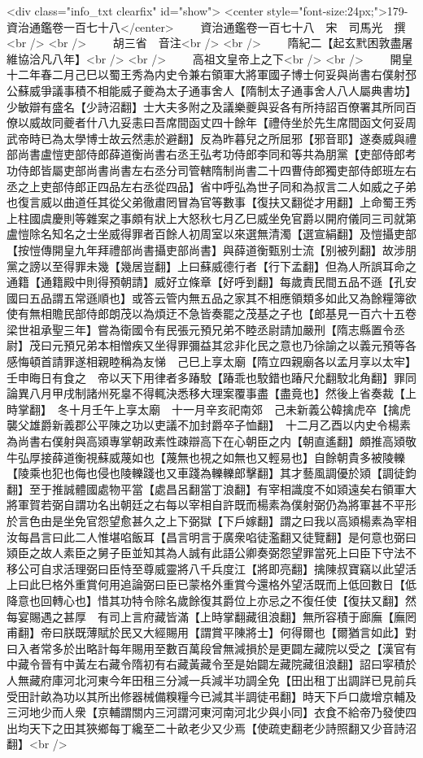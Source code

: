 <div class="info_txt clearfix" id="show">
<center style="font-size:24px;">179-資治通鑑卷一百七十八</center>
  　　資治通鑑卷一百七十八　宋　司馬光　撰<br />
<br />
　　胡三省　音注<br />
<br />
　　隋紀二【起玄黓困敦盡屠維協洽凡八年】<br />
<br />
　　高祖文皇帝上之下<br />
<br />
　　開皇十二年春二月己巳以蜀王秀為内史令兼右領軍大將軍國子博士何妥與尚書右僕射邳公蘇威爭議事積不相能威子夔為太子通事舍人【隋制太子通事舍人八人屬典書坊】少敏辯有盛名【少詩沼翻】士大夫多附之及議樂夔與妥各有所持詔百僚署其所同百僚以威故同夔者什八九妥恚曰吾席間函丈四十餘年【禮侍坐於先生席間函文何妥周武帝時已為太學博士故云然恚於避翻】反為昨暮兒之所屈邪【邪音耶】遂奏威與禮部尚書盧愷吏部侍郎薛道衡尚書右丞王弘考功侍郎李同和等共為朋黨【吏部侍郎考功侍郎皆屬吏部尚書尚書左右丞分司管轄隋制尚書二十四曹侍郎獨吏部侍郎班左右丞之上吏部侍郎正四品左右丞從四品】省中呼弘為世子同和為叔言二人如威之子弟也復言威以曲道任其從父弟徹肅罔冒為官等數事【復扶又翻從才用翻】上命蜀王秀上柱國虞慶則等雜案之事頗有狀上大怒秋七月乙巳威坐免官爵以開府儀同三司就第盧愷除名知名之士坐威得罪者百餘人初周室以來選無清濁【選宣絹翻】及愷攝吏部【按愷傳開皇九年拜禮部尚書攝吏部尚書】與薛道衡甄别士流【别被列翻】故涉朋黨之謗以至得罪未幾【幾居豈翻】上曰蘇威德行者【行下孟翻】但為人所誤耳命之通籍【通籍殿中則得預朝請】威好立條章【好呼到翻】每歲責民間五品不遜【孔安國曰五品謂五常遜順也】或答云管内無五品之家其不相應領類多如此又為餘糧簿欲使有無相贍民部侍郎朗茂以為煩迂不急皆奏罷之茂基之子也【郎基見一百六十五卷梁世祖承聖三年】嘗為衛國令有民張元預兄弟不睦丞尉請加嚴刑【隋志縣置令丞尉】茂曰元預兄弟本相憎疾又坐得罪彌益其忿非化民之意也乃徐諭之以義元預等各感悔頓首請罪遂相親睦稱為友悌　己巳上享太廟【隋立四親廟各以孟月享以太牢】　壬申晦日有食之　帝以天下用律者多踳駮【踳乖也駮錯也踳尺允翻駮北角翻】罪同論異八月甲戌制諸州死辠不得輒決悉移大理案覆事盡【盡竟也】然後上省奏裁【上時掌翻】　冬十月壬午上享太廟　十一月辛亥祀南郊　己未新義公韓擒虎卒【擒虎襲父雄爵新義郡公平陳之功以吏議不加封爵卒子恤翻】　十二月乙酉以内史令楊素為尚書右僕射與高熲專掌朝政素性疎辯高下在心朝臣之内【朝直遙翻】頗推高熲敬牛弘厚接薛道衡視蘇威蔑如也【蔑無也視之如無也又輕易也】自餘朝貴多被陵轢【陵乘也犯也侮也侵也陵轢踐也又車踐為轢轢郎擊翻】其才藝風調優於熲【調徒鈞翻】至于推誠體國處物平當【處昌呂翻當丁浪翻】有宰相識度不如熲遠矣右領軍大將軍賀若弼自謂功名出朝廷之右每以宰相自許既而楊素為僕射弼仍為將軍甚不平形於言色由是坐免官怨望愈甚久之上下弼獄【下戶嫁翻】謂之曰我以高熲楊素為宰相汝每昌言曰此二人惟堪啗飯耳【昌言明言于廣衆啗徒濫翻又徒覽翻】是何意也弼曰熲臣之故人素臣之舅子臣並知其為人誠有此語公卿奏弼怨望罪當死上曰臣下守法不移公可自求活理弼曰臣恃至尊威靈將八千兵度江【將即亮翻】擒陳叔寶竊以此望活上曰此巳格外重賞何用追論弼曰臣已蒙格外重賞今還格外望活既而上低回數日【低降意也回轉心也】惜其功特令除名歲餘復其爵位上亦忌之不復任使【復扶又翻】然每宴賜遇之甚厚　有司上言府藏皆滿【上時掌翻藏徂浪翻】無所容積于廊廡【廡罔甫翻】帝曰朕既薄賦於民又大經賜用【謂賞平陳將士】何得爾也【爾猶言如此】對曰入者常多於出略計每年賜用至數百萬段曾無減損於是更闢左藏院以受之【漢官有中藏令晉有中黃左右藏令隋初有右藏黃藏令至是始闢左藏院藏徂浪翻】詔曰寜積於人無藏府庫河北河東今年田租三分減一兵減半功調全免【田出租丁出調詳已見前兵受田計畝為功以其所出修器械備糗糧今已減其半調徒弔翻】時天下戶口歲增京輔及三河地少而人衆【京輔謂關内三河謂河東河南河北少與小同】衣食不給帝乃發使四出均天下之田其狹鄉每丁纔至二十畝老少又少焉【使疏吏翻老少詩照翻又少音詩沼翻】<br />
